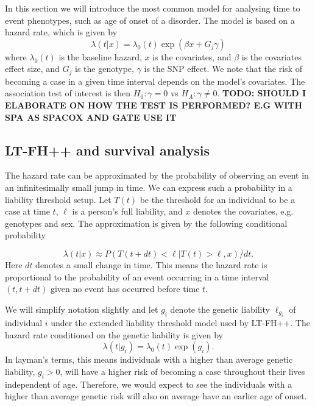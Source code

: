 In this section we will introduce the most common model for analysing time to event phenotypes, such as age of onset of a disorder. The model is based on a hazard rate, which is given by 
\begin{equation}
	\lambda(t | x) = \lambda_0(t)\exp(\beta x + G_j\gamma)
\end{equation}
where $ \lambda_0(t) $ is the baseline hazard, $ x $ is the covariates, and $ \beta $ is the covariates effect size, and $ G_j $ is the genotype, $ \gamma $ is the SNP effect. We note that the risk of becoming a case in a given time interval depends on the model's covariates. The association test of interest is then $ H_0: \gamma = 0 $ vs $ H_A: \gamma \neq 0 $.
\textbf{TODO: SHOULD I ELABORATE ON HOW THE TEST IS PERFORMED? E.G WITH SPA AS SPACOX AND GATE USE IT}


\subsection{LT-FH++ and survival analysis}
The hazard rate can be approximated by the probability of observing an event in an infinitesimally small jump in time\cite{kragh2021analysis}. We can express such a probability in a liability threshold setup. Let $ T(t) $ be the threshold for an individual to be a case at time $ t $, $ \ell $ is a person's full liability, and $ x $ denotes the covariates, e.g. genotypes and sex. The approximation is given by the following conditional probability

\begin{equation}\label{eq:ltm_case_prob_approx}
	\lambda(t|x) \approx 
	P(T(t + dt) < \ell | T(t) > \ell, x) / dt.
\end{equation}
Here $ dt $ denotes a small change in time. This means the hazard rate is proportional to the probability of an event occurring in a time interval $ (t, t + dt) $ given no event has occurred before time $ t $.

We will simplify notation slightly and let $ g_i $ denote the genetic liability $ \ell_{g_i} $ of individual $ i $ under the extended liability threshold model used by LT-FH++. The hazard rate conditioned on the genetic liability is given by
\begin{equation}
	\lambda(t | g_i) = \lambda_0(t) \exp(g_i).
\end{equation}
In layman's terms, this means individuals with a higher than average genetic liability, $ g_i > 0 $, will have a higher risk of becoming a case throughout their lives independent of age. Therefore, we would expect to see the individuals with a higher than average genetic risk will also on average have an earlier age of onset.

